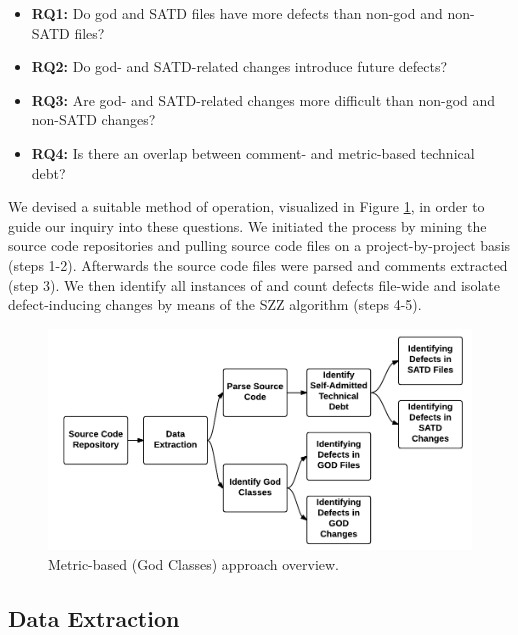 \begin{itemize}
	\vspace{0.1cm}
	\item {\bf RQ1:} Do god and SATD files have more defects than non-god and non-SATD files?
	\item {\bf RQ2:} Do god- and SATD-related changes introduce future defects?
	\item {\bf RQ3:} Are god- and SATD-related changes more difficult than non-god and non-SATD changes?
	\item {\bf RQ4:} Is there an overlap between comment- and metric-based technical debt? 
\end{itemize}

We devised a suitable method of operation, visualized in Figure \ref{fig:CH4_Process_overview}, in order to guide our inquiry into these questions. We initiated the process by mining the source code repositories and pulling source code files on a project-by-project basis (steps 1-2). Afterwards the source code files were parsed and comments extracted (step 3). We then identify all instances of \SATD and count defects file-wide and isolate defect-inducing changes by means of the SZZ algorithm (steps 4-5).

\begin{figure}[h]
	\centering
	\includegraphics[width=150mm]{figures/chapter4/approach}
	\caption{Metric-based (God Classes) approach overview.}
	\label{fig:CH4_Process_overview}
\end{figure}


\subsection{Data Extraction}

